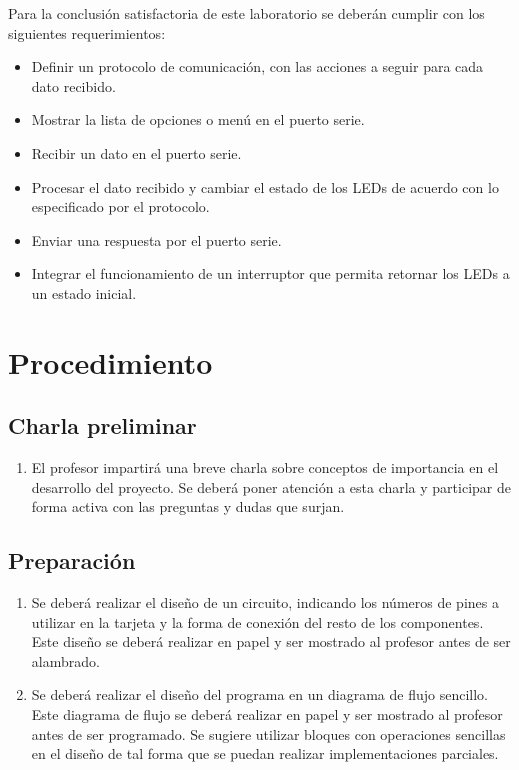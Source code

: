\documentclass[12pt,letterpaper]{IEEEtran}
\begin{document}
Para la conclusión satisfactoria de este laboratorio se deberán cumplir con los siguientes requerimientos:

\begin{itemize}
	\item Definir un protocolo de comunicación, con las acciones a seguir para cada dato recibido.
	\item Mostrar la lista de opciones o menú en el puerto serie.
	\item Recibir un dato en el puerto serie.
	\item Procesar el dato recibido y cambiar el estado de los LEDs de acuerdo con lo especificado por el protocolo.
	\item Enviar una respuesta por el puerto serie.
	\item Integrar el funcionamiento de un interruptor que permita retornar los LEDs a un estado inicial.
\end{itemize}

\section{Procedimiento}

\subsection{Charla preliminar}

\begin{enumerate}
	\item El profesor impartirá una breve charla sobre conceptos de importancia en el desarrollo del proyecto. Se deberá poner atención a esta charla y participar de forma activa con las preguntas y dudas que surjan.
\end{enumerate}


\subsection{Preparación}

\begin{enumerate}[resume]
	\item Se deberá realizar el diseño de un circuito, indicando los números de pines a utilizar en la tarjeta y la forma de conexión del resto de los componentes. Este diseño se deberá realizar en papel y ser mostrado al profesor antes de ser alambrado.

	\item Se deberá realizar el diseño del programa en un diagrama de flujo sencillo. Este diagrama de flujo se deberá realizar en papel y ser mostrado al profesor antes de ser programado. Se sugiere utilizar bloques con operaciones sencillas en el diseño de tal forma que se puedan realizar implementaciones parciales.
\end{enumerate}
\end{document}
